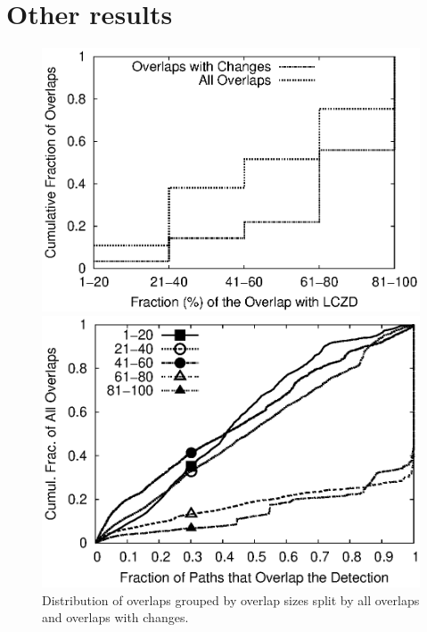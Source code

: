 \section{Other results}

\begin{figure}
\vspace{5mm}
\begin{minipage}{0.32\textwidth}
\includegraphics[width=1.05\columnwidth]{figs/patching/probchangezones/zones_changes_overlaps.eps}
\caption{Distribution of overlaps grouped by overlap sizes split by all overlaps
and overlaps with changes.}
\label{fig:zones.overlaps.changes}
%
\end{minipage}
\hfill
\begin{minipage}{0.32\textwidth}
\includegraphics[width=1.05\columnwidth]{figs/patching/probchangezones/zones_overlaps_per_intersect.eps}

\end{minipage}
\end{figure}
